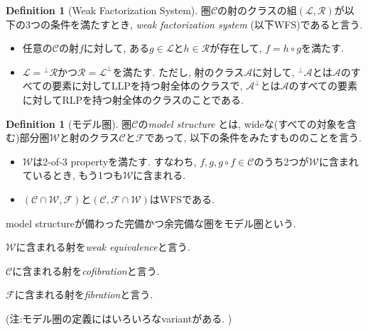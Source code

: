 \documentclass[. /main]{subfiles}
\theoremstyle{definition}
\newtheorem{defi}[theo]{Definition}
\begin{document}
\begin{defi}[Weak Factorization System]
圏$\mathcal{C}$の射のクラスの組$(\mathcal{L},  \mathcal{R})$が以下の3つの条件を満たすとき, {\it weak factorization system} (以下WFS)であると言う. 
\begin{itemize}
\item[(a)] 任意の$\mathcal{C}$の射$f$に対して, ある$g \in \mathcal{L}$と$h \in \mathcal{R}$が存在して, $f = h \circ g$を満たす.
\item[(b)] $\mathcal{L} = {}^{\perp}\mathcal{R}$かつ$\mathcal{R
} = {\mathcal{L}}^{\perp}$を満たす. ただし, 射のクラス$\mathcal{A}$に対して, ${}^{\perp}\mathcal{A}$とは$\mathcal{A}$のすべての要素に対してLLPを持つ射全体のクラスで, ${\mathcal{A}}^{\perp}$とは$\mathcal{A}$のすべての要素に対してRLPを持つ射全体のクラスのことである. 
\end{itemize}
\end{defi}

\begin{defi}[モデル圏]
圏$\mathcal{C}$の{\it model structure} とは, wideな(すべての対象を含む)部分圏$\mathcal{W}$と射のクラス$\mathcal{C}$と$\mathcal{F}$であって, 以下の条件をみたすもののことを言う. 
\begin{itemize}
\item[(1)] $\mathcal{W}$は2-of-3 propertyを満たす. すなわち, $f,  g,  g \circ f \in \mathcal{C}$のうち2つが$\mathcal{W}$に含まれているとき, もう1つも$\mathcal{W}$に含まれる. 
\item[(2)] $(\mathcal{C} \cap \mathcal{W},  \mathcal{F})$と$(\mathcal{C},  \mathcal{F} \cap \mathcal{W})$はWFSである. 
\end{itemize}

model structureが備わった完備かつ余完備な圏をモデル圏という. 

$\mathcal{W}$に含まれる射を{\it weak equivalence}と言う. 

$\mathcal{C}$に含まれる射を{\it cofibration}と言う. 

$\mathcal{F}$に含まれる射を{\it fibration}と言う. 

(注:モデル圏の定義にはいろいろなvariantがある. )
\end{defi}
\end{document}
